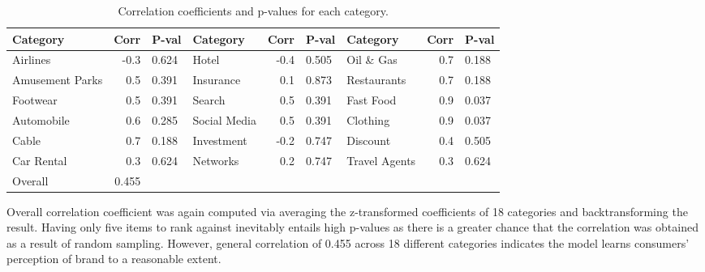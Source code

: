 \documentclass[a4paper,12pt,twoside,openright]{report}
\begin{document}
\begin{table}[h]
\vspace{0.2cm}
\footnotesize
\hspace{-0.8cm}
\begin{tabular}{lrl|lrl|lrl}
Category            & Corr & P-val & Category     & Corr & P-val & Category      & Corr & P-val \\ \hline
Airlines            & -0.3 & 0.624 & Hotel        & -0.4 & 0.505 & Oil \& Gas    & 0.7  & 0.188 \\
Amusement Parks     & 0.5  & 0.391 & Insurance    & 0.1  & 0.873 & Restaurants   & 0.7  & 0.188 \\
Footwear & 0.5  & 0.391 & Search       & 0.5  & 0.391 & Fast Food     & 0.9  & 0.037 \\
Automobile          & 0.6  & 0.285 & Social Media & 0.5  & 0.391 & Clothing      & 0.9  & 0.037 \\
Cable               & 0.7  & 0.188 & Investment   & -0.2 & 0.747 & Discount      & 0.4  & 0.505 \\
Car Rental          & 0.3  & 0.624 & Networks     & 0.2  & 0.747 & Travel Agents & 0.3  & 0.624 \\ \hline 
Overall             & 0.455     &       &              &      &       &               &      &      \\ \hline
\end{tabular}
\caption{Correlation coefficients and p-values for each category.}
\label{tab:chap5:brand_eval_corr}
\end{table}

Overall correlation coefficient was again computed via averaging the z-transformed coefficients of 18 categories and backtransforming the result. Having only five items to rank against inevitably entails high p-values as there is a greater chance that the correlation was obtained as a result of random sampling. However, general correlation of 0.455 across 18 different categories indicates the model learns consumers' perception of brand to a reasonable extent.
\end{document}
